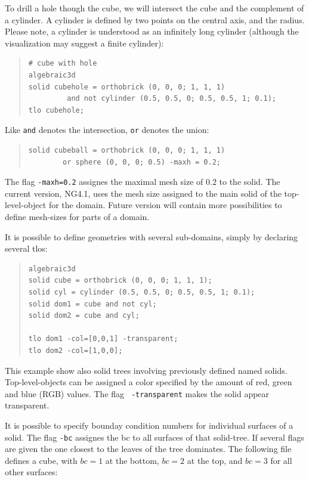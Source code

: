 \documentclass[12pt]{book}
\begin{document}
To drill a hole though the cube, we will intersect the cube
and the complement of a cylinder. A cylinder is defined by two points
on the central axis, and the radius.  Please note, a cylinder is
understood as an infinitely long cylinder (although the visualization
may suggest a finite cylinder):
\begin{quote}
\begin{verbatim}
# cube with hole
algebraic3d
solid cubehole = orthobrick (0, 0, 0; 1, 1, 1)
         and not cylinder (0.5, 0.5, 0; 0.5, 0.5, 1; 0.1);
tlo cubehole;
\end{verbatim}
\end{quote}

Like {\tt and} denotes the intersection, {\tt or} denotes the union:
\begin{quote}
\begin{verbatim}
solid cubeball = orthobrick (0, 0, 0; 1, 1, 1)
        or sphere (0, 0, 0; 0.5) -maxh = 0.2;
\end{verbatim}
\end{quote}
The flag {\tt -maxh=0.2} assignes the maximal mesh size of $0.2$ to
the solid. The current version, NG4.1, uses the mesh size assigned to
the main solid of the top-level-object for the domain. Future version
will contain more possibilities to define mesh-sizes for parts of a
domain.

It is possible to define geometries with several sub-domains, simply
by declaring several tlos: 
\begin{quote}
\begin{verbatim}
algebraic3d
solid cube = orthobrick (0, 0, 0; 1, 1, 1);
solid cyl = cylinder (0.5, 0.5, 0; 0.5, 0.5, 1; 0.1);
solid dom1 = cube and not cyl;
solid dom2 = cube and cyl;

tlo dom1 -col=[0,0,1] -transparent;
tlo dom2 -col=[1,0,0];
\end{verbatim}
\end{quote}
This example show also solid trees involving previously defined named
solids. Top-level-objects can be assigned a color specified by the
amount of red, green and blue (RGB) values. The flag {\tt
  -transparent} makes the solid appear transparent.


It is possible to specify bounday condition numbers for individual
surfaces of a solid. The flag {\tt -bc} assignes the bc to all 
surfaces of that solid-tree. If several flags are given the one closest
to the leaves of the tree dominates. The following file defines a 
cube, with $bc=1$ at the bottom, $bc=2$ at the top, and $bc=3$ for 
all other surfaces:
\end{document}
